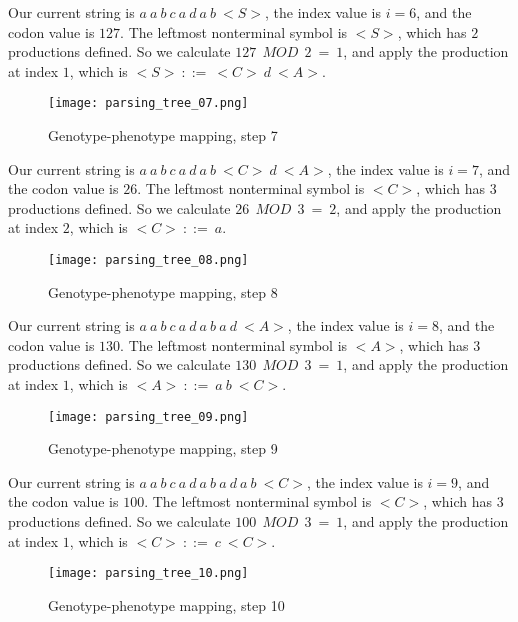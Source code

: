 \clearpage

Our current string is $a\:a\:b\:c\:a\:d\:a\:b\:{<}S{>}$, the index value is $i = 6$, and the codon value is $127$. The leftmost nonterminal symbol is ${<}S{>}$, which has $2$ productions defined. So we calculate $127\:\:MOD\:\:2\:=\:1$, and apply the production at index $1$, which is ${<}S{>}\:::=\:{<}C{>}\:d\:{<}A{>}$.

\begin{figure}[H]
	\centering
	\texttt{[image: parsing\_tree\_07.png]}
	\caption{Genotype-phenotype mapping, step 7}
\end{figure}

\clearpage

Our current string is $a\:a\:b\:c\:a\:d\:a\:b\:{<}C{>}\:d\:{<}A{>}$, the index value is $i = 7$, and the codon value is $26$. The leftmost nonterminal symbol is ${<}C{>}$, which has $3$ productions defined. So we calculate $26\:\:MOD\:\:3\:=\:2$, and apply the production at index $2$, which is ${<}C{>}\:::=\:a$.

\begin{figure}[H]
	\centering
	\texttt{[image: parsing\_tree\_08.png]}
	\caption{Genotype-phenotype mapping, step 8}
\end{figure}

\clearpage

Our current string is $a\:a\:b\:c\:a\:d\:a\:b\:a\:d\:{<}A{>}$, the index value is $i = 8$, and the codon value is $130$. The leftmost nonterminal symbol is ${<}A{>}$, which has $3$ productions defined. So we calculate $130\:\:MOD\:\:3\:=\:1$, and apply the production at index $1$, which is ${<}A{>}\:::=\:a\:b\:{<}C{>}$.

\begin{figure}[H]
	\centering
	\texttt{[image: parsing\_tree\_09.png]}
	\caption{Genotype-phenotype mapping, step 9}
\end{figure}

\clearpage

Our current string is $a\:a\:b\:c\:a\:d\:a\:b\:a\:d\:a\:b\:{<}C{>}$, the index value is $i = 9$, and the codon value is $100$. The leftmost nonterminal symbol is ${<}C{>}$, which has $3$ productions defined. So we calculate $100\:\:MOD\:\:3\:=\:1$, and apply the production at index $1$, which is ${<}C{>}\:::=\:c\:{<}C{>}$.

\begin{figure}[H]
	\centering
	\texttt{[image: parsing\_tree\_10.png]}
	\caption{Genotype-phenotype mapping, step 10}
\end{figure}

